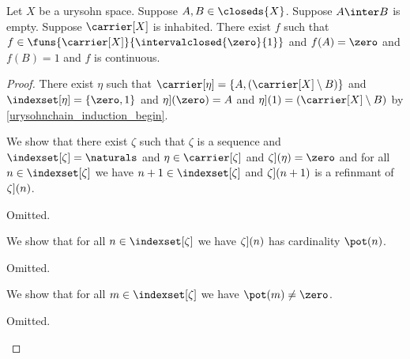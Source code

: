 \begin{theorem}\label{urysohn}
    Let $X$ be a urysohn space.
    Suppose $A,B \in \closeds{X}$.
    Suppose $A \inter B$ is empty.
    Suppose $\carrier[X]$ is inhabited.
    There exist $f$ such that $f \in \funs{\carrier[X]}{\intervalclosed{\zero}{1}}$ 
    and $f(A) = \zero$ and $f(B)= 1$ and $f$ is continuous.
\end{theorem}
\begin{proof}
    
    There exist $\eta$ such that $\carrier[\eta] = \{A, (\carrier[X] \setminus B)\}$ 
    and $\indexset[\eta] = \{\zero, 1\}$ 
    and $\index[\eta](\zero) = A$
    and $\index[\eta](1) = (\carrier[X] \setminus B)$  by \cref{urysohnchain_induction_begin}.
    
    We show that there exist $\zeta$ such that $\zeta$ is a sequence 
    and $\indexset[\zeta] = \naturals$
    and $\eta \in \carrier[\zeta]$ and $\index[\zeta](\eta) = \zero$
    and for all $n \in \indexset[\zeta]$ we have $n+1 \in \indexset[\zeta]$ 
    and $\index[\zeta](n+1)$ is a refinmant of $\index[\zeta](n)$.
    \begin{subproof}
        Omitted.
    \end{subproof}

    We show that for all $n \in \indexset[\zeta]$ we have $\index[\zeta](n)$ has cardinality $\pot(n)$.
    \begin{subproof}
        Omitted.
    \end{subproof}

    We show that for all $m \in \indexset[\zeta]$ we have $\pot(m) \neq \zero$.
    \begin{subproof}
        Omitted.
    \end{subproof}


\end{proof}
